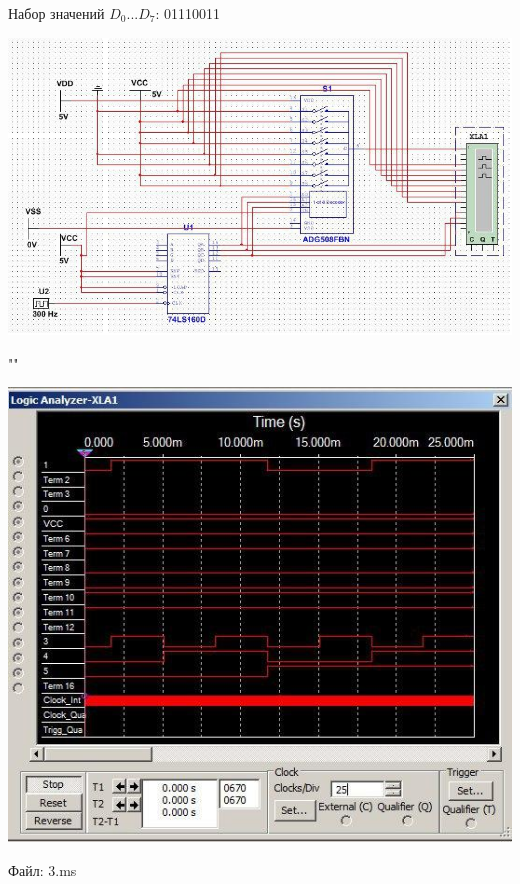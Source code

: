 \documentclass[a4paper,12pt]{article}
\begin{document}
\noindent Набор значений $D_{0}...D_{7}$: 01110011
\begin{center}
	\includegraphics[scale=0.8]{../screens/5.jpg}
	
	""
	
	\includegraphics[scale=0.82]{../screens/6.jpg}
\end{center}

\noindent Файл: 3.ms
\end{document}
